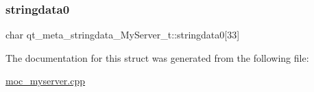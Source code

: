 \subsubsection{\texorpdfstring{stringdata0}{stringdata0}}
{\footnotesize\ttfamily char qt\+\_\+meta\+\_\+stringdata\+\_\+\+My\+Server\+\_\+t\+::stringdata0\mbox{[}33\mbox{]}}



The documentation for this struct was generated from the following file\+:\begin{DoxyCompactItemize}
\item 
\mbox{\hyperlink{moc__myserver_8cpp}{moc\+\_\+myserver.\+cpp}}\end{DoxyCompactItemize}
